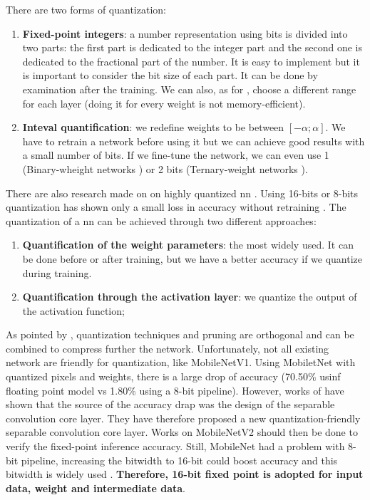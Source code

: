 There are two forms of quantization:
\begin{enumerate}
    \item \textbf{Fixed-point integers}: a number representation using bits is divided into two parts: the first part is dedicated to the integer part and the second one is dedicated to the fractional part of the number. It is easy to implement but it is important to consider the bit size of each part. It can be done by examination after the training. We can also, as for \cite{qiu_going_2016, yin_high_2018}, choose a different range for each layer (doing it for every weight is not memory-efficient).
    \item \textbf{Inteval quantification}: we redefine weights to be between $[-\alpha; \alpha]$. We have to retrain a network before using it but we can achieve good results with a small number of bits. If we fine-tune the network, we can even use 1 (Binary-wheight networks \cite{courbariaux_binarized_2016}) or 2 bits (Ternary-weight networks \cite{li_ternary_2016}).
\end{enumerate}
%
There are also research made on on highly quantized \acrshort{nn} \cite{guo_survey_2018}. Using 16-bits or 8-bits quantization has shown only a small loss in accuracy without retraining \cite{abdelouahab_accelerating_2018}. The quantization of a \acrshort{nn} can be achieved through two different approaches:
\begin{enumerate}
    \item \textbf{Quantification of the weight parameters}: the most widely used. It can be done before or after training, but we have a better accuracy if we quantize during training.
    \item \textbf{Quantification through the activation layer}: we quantize the output of the activation function;
\end{enumerate}
As pointed by \textcite{han_deep_2016}, quantization techniques and pruning are orthogonal and can be combined to compress further the network. Unfortunately, not all existing network are friendly for quantization, like MobileNetV1. Using MobiletNet with quantized pixels and weights, there is a large drop of accuracy (70.50\% usinf floating point model vs 1.80\% using a 8-bit pipeline). However, works of \textcite{sheng_quantization-friendly_2018} have shown that the source of the accuracy drap was the design of the separable convolution core layer. They have therefore proposed a new quantization-friendly separable convolution core layer. Works on MobileNetV2 should then be done to verify the fixed-point inference accuracy. Still, MobileNet had a problem with 8-bit pipeline, increasing the bitwidth to 16-bit could boost accuracy \cite{cheng_recent_2018} and this bitwidth is widely used \cite{huimin_li_high_2016, bai_cnn_2018}. \textbf{Therefore, 16-bit fixed point is adopted for input data, weight and intermediate data}.
